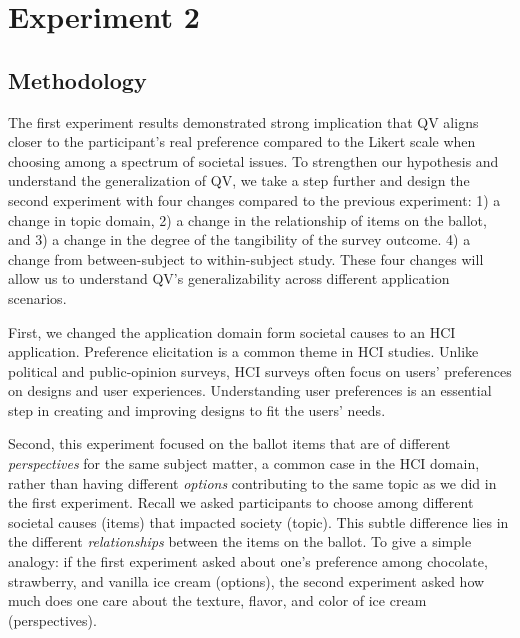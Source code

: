 \section{Experiment 2}
\subsection{Methodology} \label{method-2}


The first experiment results demonstrated strong implication that QV aligns closer to the participant's real preference compared to the Likert scale when choosing among a spectrum of societal issues. To strengthen our hypothesis and understand the generalization of QV, we take a step further and design the second experiment with four changes compared to the previous experiment: 1) a change in topic domain, 2) a change in the relationship of items on the ballot, and 3) a change in the degree of the tangibility of the survey outcome. 4) a change from between-subject to within-subject study. These four changes will allow us to understand QV's generalizability across different application scenarios. 

First, we changed the application domain form societal causes to an HCI application. Preference elicitation is a common theme in HCI studies. Unlike political and public-opinion surveys, HCI surveys often focus on users' preferences on designs and user experiences. Understanding user preferences is an essential step in creating and improving designs to fit the users' needs.

Second, this experiment focused on the ballot items that are of different \textit{perspectives} for the same subject matter, a common case in the HCI domain, rather than having different \textit{options} contributing to the same topic as we did in the first experiment. Recall we asked participants to choose among different societal causes (items) that impacted society (topic). This subtle difference lies in the different \textit{relationships} between the items on the ballot. To give a simple analogy: if the first experiment asked about one's preference among chocolate, strawberry, and vanilla ice cream (options), the second experiment asked how much does one care about the texture, flavor, and color of ice cream (perspectives). 

